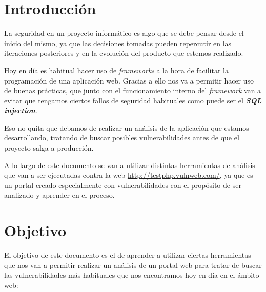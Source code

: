 \documentclass{\ClassPath/viu-tfm-template}
\begin{document}
\graphicspath{{../VIU_TFM_LaTeX_template/}}

\coverpage

\tableofcontents

\chapter{Introducción}

La seguridad en un proyecto informático es algo que se debe pensar desde el inicio del mismo, ya que las decisiones tomadas pueden repercutir en las iteraciones posteriores y en la evolución del producto que estemos realizado.

Hoy en día es habitual hacer uso de \textit{frameworks} a la hora de facilitar la programación de una aplicación web. Gracias a ello nos va a permitir hacer uso de buenas prácticas, que junto con el funcionamiento interno del \textit{framework} van a evitar que tengamos ciertos fallos de seguridad habituales como puede ser el \textbf{\textit{SQL injection}}.

Eso no quita que debamos de realizar un análisis de la aplicación que estamos desarrollando, tratando de buscar posibles vulnerabilidades antes de que el proyecto salga a producción.

A lo largo de este documento se van a utilizar distintas herramientas de análisis que van a ser ejecutadas contra la web \href{http://testphp.vulnweb.com/}{http://testphp.vulnweb.com/}, ya que es un portal creado especialmente con vulnerabilidades con el propósito de ser analizado y aprender en el proceso.


\chapter{Objetivo}
El objetivo de este documento es el de aprender a utilizar ciertas herramientas que nos van a permitir realizar un análisis de un portal web para tratar de buscar las vulnerabilidades más habituales que nos encontramos hoy en día en el ámbito web:
\end{document}
